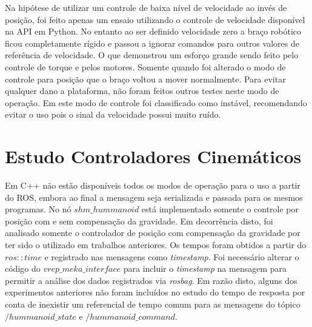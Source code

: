 Na hipótese de utilizar um controle de baixa nível de velocidade ao invés de posição, foi feito apenas um ensaio utilizando o controle de velocidade disponível na API em Python. No entanto ao ser definido velocidade zero a braço robótico ficou completamente rígido e passou a ignorar comandos para outros valores de referência de velocidade. O que demonstrou um esforço grande sendo feito pelo controle de torque e pelos motores. Somente quando foi alterado o modo de controle para posição que o braço voltou a mover normalmente. Para evitar qualquer dano a plataforma, não foram feitos outros testes neste modo de operação. Em \cite{mekartfd} este modo de controle foi classificado como instável, recomendando evitar o uso pois o sinal da velocidade possui muito ruído.





\section{Estudo Controladores Cinemáticos}

Em C++ não estão disponíveis todos os modos de operação para o uso a partir do ROS, embora ao final a mensagem seja serializada e passada para os mesmos programas. No nó $shm\_hummanoid$ está implementado somente o controle por posição com e sem compensação da gravidade. Em decorrência disto, foi analisado somente o controlador de posição com compensação da gravidade por ter sido o utilizado em trabalhos anteriores. Os tempos foram obtidos a partir do $ros::time$ e registrado nas mensagens como \textit{timestamp}. Foi necessário alterar o código do $vrep\_meka\_interface$ para incluir o \textit{timestamp} na mensagem para permitir a análise dos dados registrados via \textit{rosbag}. Em razão disto, alguns dos experimentos anteriores não foram incluídos no estudo do tempo de resposta por conta de inexistir um referencial de tempo comum para as mensagens do tópico $/hummanoid\_state$ e $/hummanoid\_command$.

